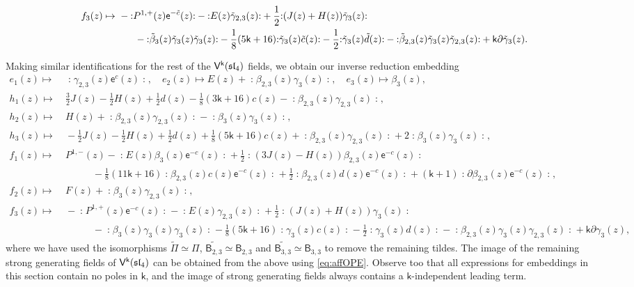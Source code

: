 \documentclass[10pt,a4paper]{amsart}
\numberwithin{equation}{section}
\renewcommand{\cong}{\simeq} %
\newcommand{\ee}{\mathsf{e}}   %
\newcommand{\kk}{\mathsf{k}}   %
\DeclarePairedDelimiter{\brac}{\lparen}{\rparen}   %
\newcommand{\no}[1]{\mathopen{:} #1 \mathclose{:}} %
\newcommand{\alg}[1]{\mathfrak{#1}}  %
\newcommand{\VOA}[1]{\mathsf{#1}}    %
\newcommand{\SLA}[2]{\alg{#1}_{#2}}                      %
\newcommand{\slfour}{\SLA{sl}{4}}
\newcommand{\uaffvoa}[2]{\VOA{V}^{#1}\brac{#2}}                   %
\newcommand{\bgvoa}{\VOA{B}}                                      %
\theoremstyle{plain}
\begin{document}
%
\begin{align}
    f_3(z) \mapsto&\ -\no{P^{1,+}(z) \ee^{-\tilde{c}}(z)} - \no{E(z)\tilde{\gamma}_{2,3}(z)} + \frac{1}{2}\no{(J(z)+H(z)) \tilde{\gamma}_3(z)}  \\
        &\hspace{2em} - \no{\tilde{\beta}_{3}(z)\tilde{\gamma}_3(z)\tilde{\gamma}_{3}(z)} - \frac{1}{8}(5\kk+16) \no{\tilde{\gamma}_3(z)\tilde{c}(z)} - \frac{1}{2} \no{\tilde{\gamma}_3(z)\tilde{d}(z)} - \no{\tilde{\beta}_{2,3}(z)\tilde{\gamma}_3(z)\tilde{\gamma}_{2,3}(z)} + \kk \partial\tilde{\gamma}_3(z). \notag
\end{align}

Making similar identifications for the rest of the  $\uaffvoa{\kk}{\slfour}$ fields, we obtain our inverse reduction embedding
%
\begin{equation} \label{eq:sl4MintoAff}
\begin{aligned}
    e_1(z) \mapsto&\ \no{\gamma_{2,3}(z) \ee^{c}(z)}, \quad 
    e_2(z) \mapsto E(z) + \no{\beta_{2,3}(z)\gamma_3(z)}, \quad
    e_3(z) \mapsto \beta_3(z),\\
    h_1(z) \mapsto&\ \frac{3}{2}J(z) - \frac{1}{2} H(z) + \frac{1}{2}d(z) - \frac{1}{8}(3\kk+16)c(z)- \no{\beta_{2,3}(z)\gamma_{2,3}(z)},\\
    h_2(z) \mapsto&\ H(z) + \no{\beta_{2,3}(z)\gamma_{2,3}(z)} - \no{\beta_{3}(z)\gamma_{3}(z)},\\
    h_3(z) \mapsto&\ -\frac{1}{2} J(z) - \frac{1}{2} H(z) + \frac{1}{2}d(z) + \frac{1}{8}(5\kk+16) c(z) + \no{\beta_{2,3}(z)\gamma_{2,3}(z)} + 2 \no{\beta_{3}(z)\gamma_{3}(z)},\\
    f_1(z) \mapsto&\ P^{1,-}(z) - \no{E(z)\beta_3(z) \ee^{-c}(z)} + \frac{1}{2}\no{\left(3 J(z) - H(z)\right) \beta_{2,3}(z) \ee^{-c}(z)} \\
        &\hspace{3em} - \frac{1}{8} (11 \kk+16) \no{\beta_{2,3}(z) c(z) \ee^{-c}(z)} + \frac{1}{2} \no{\beta_{2,3}(z) d(z) \ee^{-c}(z)} + (\kk + 1) \no{\partial \beta_{2,3}(z) \ee^{-c}(z)},\\ 
    f_2(z) \mapsto&\ F(z) + \no{\beta_3(z) \gamma_{2,3}(z)},\\
    f_3(z) \mapsto&\ -\no{P^{1,+}(z) \ee^{-c}(z)} - \no{E(z)\gamma_{2,3}(z)} + \frac{1}{2}\no{(J(z)+H(z)) \gamma_3(z)}  \\
        &\hspace{3em} - \no{\beta_{3}(z)\gamma_3(z)\gamma_{3}(z)} - \frac{1}{8}(5\kk+16) \no{\gamma_3(z)c(z)} - \frac{1}{2} \no{\gamma_3(z)d(z)} - \no{\beta_{2,3}(z)\gamma_3(z)\gamma_{2,3}(z)} + \kk \partial \gamma_3(z),
\end{aligned}
\end{equation}
%
where we have used the isomorphisms $\widetilde{\Pi} \cong \Pi$, $\widetilde{\bgvoa_{2,3}} \cong \bgvoa_{2,3}$ and $\widetilde{\bgvoa_{3,3}} \cong \bgvoa_{3,3}$ to remove the remaining tildes. The image of the remaining strong generating fields of $\uaffvoa{\kk}{\slfour}$ can be obtained from the above using \eqref{eq:affOPE}. Observe too that all expressions for embeddings in this section contain no poles in $\kk$, and the image of strong generating fields always contains a $\kk$-independent leading term.
\end{document}
